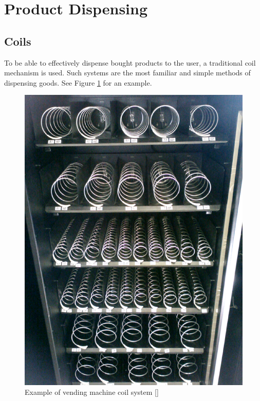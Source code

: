 \section{Product Dispensing}

\subsection{Coils}

To be able to effectively dispense bought products to the user, a traditional coil mechanism is
used. Such systems are the most familiar and simple methods of dispensing goods. See Figure
\ref{fig:vm-coils} for an example.

\begin{figure}[h]
\centering
\includegraphics[scale=0.2]{vm_coils.eps}
\caption{Example of vending machine coil system [\cite{website:arduino-specs}]}
\label{fig:vm-coils}
\end{figure}

